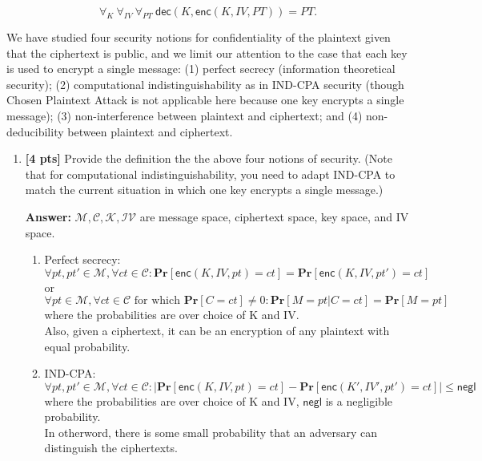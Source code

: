 \documentclass[11pt]{article}
\renewcommand{\Pr}{\ensuremath{\mathbf{Pr}}\xspace}
\newcommand{\ans}[1]{\begin{mdframed}\textbf{Answer: }#1\end{mdframed}}
\begin{document}
\begin{description}
$$\forall_{K}\: \forall_{IV}\: \forall_{PT}\: \mathsf{dec}(K, \mathsf{enc}(K,IV,PT)) = PT.$$

We have studied four security notions for confidentiality of the plaintext given that the ciphertext is public, and we limit our attention to the case that each key is used to encrypt a single message: (1) perfect secrecy (information theoretical security); (2) computational indistinguishability as in IND-CPA security (though Chosen Plaintext Attack is not applicable here because one key encrypts a single message); (3) non-interference between plaintext and ciphertext; and (4) non-deducibility between plaintext and ciphertext.

\begin{enumerate}
 \item \textbf{[4 pts]}
Provide the definition the the above four notions of security.  (Note that for computational indistinguishability, you need to adapt IND-CPA to match the current situation in which one key encrypts a single message.)
\ans{
  $\mathcal{M, C, K, IV}$ are message space, ciphertext space, key space, and IV space.
  \begin{enumerate}  
    \item Perfect secrecy:
    $$\forall pt,pt' \in \mathcal{M}, \forall ct \in \mathcal{C}: \Pr[\mathsf{enc}(K,IV,pt)=ct] =\Pr[\mathsf{enc}(K,IV,pt')=ct]$$
    or
    $$\forall pt \in \mathcal{M}, \forall ct \in \mathcal{C}\text{ for which }\Pr[C = ct]\neq 0: \Pr[M = pt | C = ct] =\Pr[M =pt]$$
    where the probabilities are over choice of K and IV. 
    \\
    Also, given a ciphertext, it can be an encryption of any plaintext with equal probability.
    \item IND-CPA:
    $$\forall pt,pt' \in \mathcal{M}, \forall ct \in \mathcal{C}: |\Pr[\mathsf{enc}(K,IV,pt)=ct] - \Pr[\mathsf{enc}(K',IV',pt')=ct]| \leq \mathsf{negl}$$
    where the probabilities are over choice of K and IV, $\mathsf{negl}$ is a negligible probability.
    \\
    In otherword, there is some small probability that an adversary can distinguish the ciphertexts.


\end{enumerate}}
\end{enumerate}
\end{description}
\end{document}
